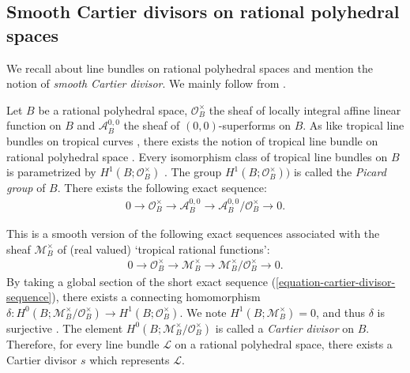 \documentclass[a4paper,dvipdfmx,reqno,12pt]{amsart}
\theoremstyle{definition}
\newcommand{\mcal}[1]{\mathcal{#1}}%
\numberwithin{equation}{section}
\begin{document}
\subsection{Smooth Cartier divisors on rational 
polyhedral spaces}



We recall about line bundles on 
rational polyhedral spaces and mention the notion of
\emph{smooth Cartier divisor}.
We mainly follow 
from \cite{MR3903579,gross2019sheaftheoretic}.


Let $B$ be a rational polyhedral space, 
$\mathcal{O}^{\times}_B$ the sheaf of 
locally integral affine linear function on $B$
and $\mathcal{A}^{0,0}_B$ the sheaf of 
$(0,0)$-superforms on $B$. 
As like tropical line bundles on tropical curves
\cite[Definition 4.4]{mikhalkinTropicalCurvesTheir2008a},
there exists the notion of tropical line bundle on 
rational polyhedral space
\cite[Definition 3.12]{gross2019sheaftheoretic}.
Every isomorphism class of 
tropical line bundles on $B$ is parametrized by 
$H^{1}(B;\mathcal{O}^{\times}_B)$
\cite[Proposition 3.13]{gross2019sheaftheoretic}.
The group $H^{1}(B;\mcal{O}^{\times}_B))$ is called 
the \emph{Picard group} of $B$.
There exists the following exact sequence:
\begin{align}
\label{equation-smoooth-cartier-divisor-sequence}
0\to \mathcal{O}^{\times}_B \to
\mathcal{A}^{0,0}_{B} \to
\mathcal{A}^{0,0}_{B}/\mathcal{O}^{\times}_B\to 0.
\end{align}

This is a smooth version of the following exact
sequences associated with the sheaf 
$\mcal{M}_B^{\times}$
of (real valued) `tropical rational functions':
\begin{align}
\label{equation-cartier-divisor-sequence}
0 \to \mcal{O}^{\times}_B \to \mcal{M}_B^{\times} 
\to \mcal{M}_B^{\times}/\mathcal{O}^{\times}_B\to 0.
\end{align}
By taking a global section of the
short exact sequence 
(\ref{equation-cartier-divisor-sequence}),
there exists a connecting homomorphism 
$\delta \colon 
H^{0}(B;\mcal{M}_B^{\times}/\mathcal{O}^{\times}_B)
\to H^{1}(B;\mathcal{O}^{\times}_B)$.
We note $H^{1}(B;\mcal{M}_{B}^{\times})=0$, 
and thus $\delta$ is surjective
\cite[Lemma 4.5, Proposition 4.6]{MR3894860}.
The element $H^{0}(B;\mcal{M}_B^{\times}/\mathcal{O}^{\times}_B)$
is called a \emph{Cartier divisor} on $B$.
Therefore, for every line bundle $\mathcal{L}$ on a rational polyhedral 
space, there exists a Cartier divisor $s$ 
which represents $\mathcal{L}$.
\end{document}
